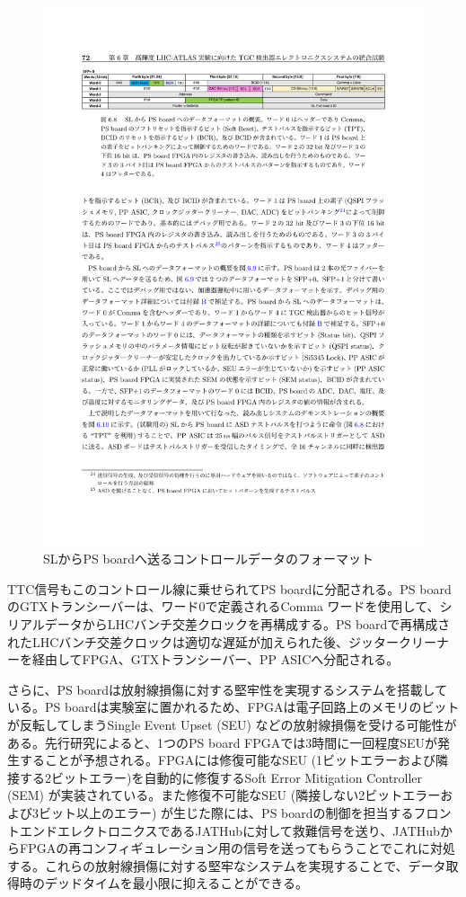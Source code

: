     \begin{figure} 
        \centering
        \includegraphics[width=16cm]{fig/Intro/TGC_PSBdownlink.pdf}
        \caption[SLからPS boardへ送るコントロールデータのフォーマット]{SLからPS boardへ送るコントロールデータのフォーマット\cite{mt_aoki}}
        \label{TGC_PSBdownlink}
    \end{figure}
    
    TTC信号もこのコントロール線に乗せられてPS boardに分配される。PS boardのGTXトランシーバーは、ワード0で定義されるComma ワードを使用して、シリアルデータからLHCバンチ交差クロックを再構成する。PS boardで再構成されたLHCバンチ交差クロックは適切な遅延が加えられた後、ジッタークリーナーを経由してFPGA、GTXトランシーバー、PP ASICへ分配される。    

    さらに、PS boardは放射線損傷に対する堅牢性を実現するシステムを搭載している。PS boardは実験室に置かれるため、FPGAは電子回路上のメモリのビットが反転してしまうSingle Event Upset  (SEU) などの放射線損傷を受ける可能性がある。先行研究\cite{PSB_SEU}によると、1つのPS board FPGAでは3時間に一回程度SEUが発生することが予想される。FPGAには修復可能なSEU  (1ビットエラーおよび隣接する2ビットエラー)を自動的に修復するSoft Error Mitigation Controller  (SEM) が実装されている。また修復不可能なSEU  (隣接しない2ビットエラーおよび3ビット以上のエラー) が生じた際には、PS boardの制御を担当するフロントエンドエレクトロニクスであるJATHubに対して救難信号を送り、JATHubからFPGAの再コンフィギュレーション用の信号を送ってもらうことでこれに対処する。これらの放射線損傷に対する堅牢なシステムを実現することで、データ取得時のデッドタイムを最小限に抑えることができる。    

